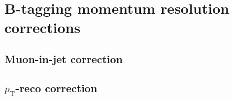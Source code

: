 \section{B-tagging momentum resolution corrections}
\label{app:b-tag-mom-res}
\subsection{Muon-in-jet correction}
\subsection{\texorpdfstring{$p_{\mathrm{T}}$}{Pt}-reco correction}